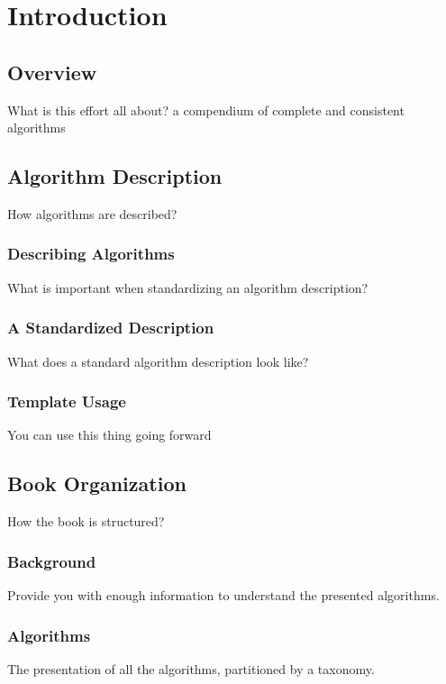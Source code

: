 \chapter{Introduction}
\label{chap:intro}

\section{Overview}
What is this effort all about?
a compendium of complete and consistent algorithms


\section{Algorithm Description}
How algorithms are described?

\subsection{Describing Algorithms}
What is important when standardizing an algorithm description?

\subsection{A Standardized Description}
What does a standard algorithm description look like?

\subsection{Template Usage}
You can use this thing going forward



\section{Book Organization}
How the book is structured?

\subsection{Background}
Provide you with enough information to understand the presented algorithms.

\subsection{Algorithms}
The presentation of all the algorithms, partitioned by a taxonomy.

